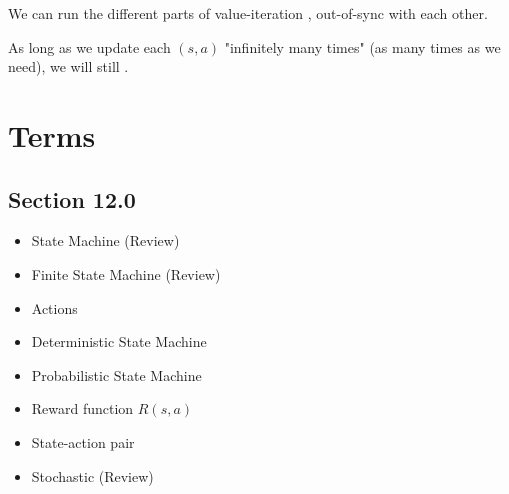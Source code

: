         \begin{concept}
            We can run the different parts of value-iteration , out-of-sync with each other.

            As long as we update each $(s,a)$ "infinitely many times" (as many times as we need), we will still .
        \end{concept}


\section{Terms}

    \subsection*{Section 12.0}
    \begin{itemize}
        \item State Machine (Review)
        \item Finite State Machine (Review)
        \item Actions
        \item Deterministic State Machine
        \item Probabilistic State Machine
        \item Reward function $R(s,a)$
        \item State-action pair
        \item Stochastic (Review)
    \end{itemize}

